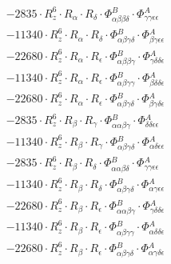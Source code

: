 \documentclass{article}
\begin{document}
\begin{subequations}
\begin{gather}
\begin{array}{c}
 \\[0.2em] 		 - 2835 \cdot R_{z}^{6} \cdot R_{\alpha{}} \cdot R_{\delta{}} \cdot \Phi{}^{B}_{\alpha{}\beta{}\beta{}\delta{}} \cdot \Phi{}^{A}_{\gamma{}\gamma{}\epsilon{}\epsilon{}} 
 \\[0.2em] 		 - 11340 \cdot R_{z}^{6} \cdot R_{\alpha{}} \cdot R_{\delta{}} \cdot \Phi{}^{B}_{\alpha{}\beta{}\gamma{}\delta{}} \cdot \Phi{}^{A}_{\beta{}\gamma{}\epsilon{}\epsilon{}} 
 \\[0.2em] 		 - 22680 \cdot R_{z}^{6} \cdot R_{\alpha{}} \cdot R_{\epsilon{}} \cdot \Phi{}^{B}_{\alpha{}\beta{}\beta{}\gamma{}} \cdot \Phi{}^{A}_{\gamma{}\delta{}\delta{}\epsilon{}} 
 \\[0.2em] 		 - 11340 \cdot R_{z}^{6} \cdot R_{\alpha{}} \cdot R_{\epsilon{}} \cdot \Phi{}^{B}_{\alpha{}\beta{}\gamma{}\gamma{}} \cdot \Phi{}^{A}_{\beta{}\delta{}\delta{}\epsilon{}} 
 \\[0.2em] 		 - 22680 \cdot R_{z}^{6} \cdot R_{\alpha{}} \cdot R_{\epsilon{}} \cdot \Phi{}^{B}_{\alpha{}\beta{}\gamma{}\delta{}} \cdot \Phi{}^{A}_{\beta{}\gamma{}\delta{}\epsilon{}} 
 \\[0.2em] 		 - 2835 \cdot R_{z}^{6} \cdot R_{\beta{}} \cdot R_{\gamma{}} \cdot \Phi{}^{B}_{\alpha{}\alpha{}\beta{}\gamma{}} \cdot \Phi{}^{A}_{\delta{}\delta{}\epsilon{}\epsilon{}} 
 \\[0.2em] 		 - 11340 \cdot R_{z}^{6} \cdot R_{\beta{}} \cdot R_{\gamma{}} \cdot \Phi{}^{B}_{\alpha{}\beta{}\gamma{}\delta{}} \cdot \Phi{}^{A}_{\alpha{}\delta{}\epsilon{}\epsilon{}} 
 \\[0.2em] 		 - 2835 \cdot R_{z}^{6} \cdot R_{\beta{}} \cdot R_{\delta{}} \cdot \Phi{}^{B}_{\alpha{}\alpha{}\beta{}\delta{}} \cdot \Phi{}^{A}_{\gamma{}\gamma{}\epsilon{}\epsilon{}} 
 \\[0.2em] 		 - 11340 \cdot R_{z}^{6} \cdot R_{\beta{}} \cdot R_{\delta{}} \cdot \Phi{}^{B}_{\alpha{}\beta{}\gamma{}\delta{}} \cdot \Phi{}^{A}_{\alpha{}\gamma{}\epsilon{}\epsilon{}} 
 \\[0.2em] 		 - 22680 \cdot R_{z}^{6} \cdot R_{\beta{}} \cdot R_{\epsilon{}} \cdot \Phi{}^{B}_{\alpha{}\alpha{}\beta{}\gamma{}} \cdot \Phi{}^{A}_{\gamma{}\delta{}\delta{}\epsilon{}} 
 \\[0.2em] 		 - 11340 \cdot R_{z}^{6} \cdot R_{\beta{}} \cdot R_{\epsilon{}} \cdot \Phi{}^{B}_{\alpha{}\beta{}\gamma{}\gamma{}} \cdot \Phi{}^{A}_{\alpha{}\delta{}\delta{}\epsilon{}} 
 \\[0.2em] 		 - 22680 \cdot R_{z}^{6} \cdot R_{\beta{}} \cdot R_{\epsilon{}} \cdot \Phi{}^{B}_{\alpha{}\beta{}\gamma{}\delta{}} \cdot \Phi{}^{A}_{\alpha{}\gamma{}\delta{}\epsilon{}} 

\end{array}
\end{gather}
\end{subequations}
\end{document}
